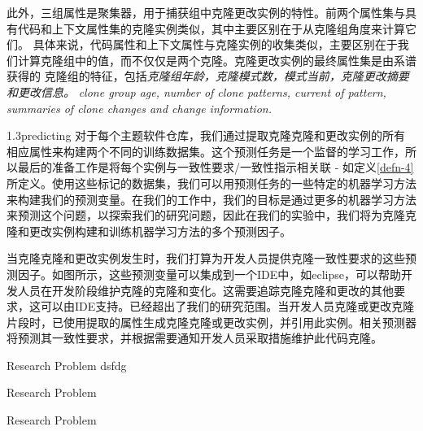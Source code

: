 此外，三组属性是聚集器，用于捕获组中克隆更改实例的特性。前两个属性集与具有代码和上下文属性集的克隆实例类似，其中主要区别在于从克隆组角度来计算它们。
具体来说，代码属性和上下文属性与克隆实例的收集类似，主要区别在于我们计算克隆组中的值，而不仅仅是两个克隆。克隆更改实例的最终属性集是由系谱获得的
克隆组的特征，包括{\em 克隆组年龄，克隆模式数，模式当前，克隆更改摘要和更改信息。}
{\em clone group age, number of clone patterns, current of pattern, summaries of clone changes and change information.}

1.3predicting
对于每个主题软件仓库，我们通过提取克隆克隆和更改实例的所有相应属性来构建两个不同的训练数据集。这个预测任务是一个监督的学习工作，所以最后的准备工作是将每个实例与一致性要求/一致性指示相关联 - 如定义\ref {defn-4}所定义。使用这些标记的数据集，我们可以用预测任务的一些特定的机器学习方法来构建我们的预测变量。在我们的工作中，我们的目标是通过更多的机器学习方法来预测这个问题，以探索我们的研究问题，因此在我们的实验中，我们将为克隆克隆和更改实例构建和训练机器学习方法的多个预测因子。

当克隆克隆和更改实例发生时，我们打算为开发人员提供克隆一致性要求的这些预测因子。如图所示，这些预测变量可以集成到一个IDE中，如eclipse，可以帮助开发人员在开发阶段维护克隆的克隆和变化。这需要追踪克隆克隆和更改的其他要求，这可以由IDE支持。已经超出了我们的研究范围。当开发人员克隆或更改克隆片段时，已使用提取的属性生成克隆克隆或更改实例，并引用此实例。相关预测器将预测其一致性要求，并根据需要通知开发人员采取措施维护此代码克隆。

{Research Problem}
dsfdg

{Research Problem}

{Research Problem}


